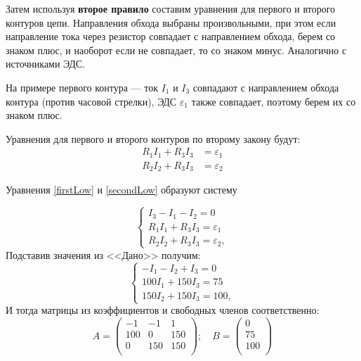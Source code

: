 \documentclass[14pt,a4paper]{article}
\begin{document}
Затем используя \textbf{второе правило} составим уравнения для первого и второго контуров цепи. Направления обхода выбраны произвольными, при этом если направление тока через резистор совпадает с направлением обхода, берем со знаком плюс, и наоборот если не совпадает, то со знаком минус. Аналогично с источниками ЭДС.

На примере первого контура --- ток $I_1$ и $I_3$ совпадают с направлением обхода контура (против часовой стрелки), ЭДС $\varepsilon_1$ также совпадает, поэтому берем их со знаком плюс.

Уравнения для первого и второго контуров по второму закону будут:
\begin{equation} \label{secondLow}
    \begin{split}
        R_1I_1 + R_3I_3 & = \varepsilon_1 \\
        R_2I_2 +R_3I_3 & = \varepsilon_2
    \end{split}
\end{equation}

Уравнения \ref{firstLow} и \ref{secondLow} образуют систему

\begin{equation}
    \begin{cases}
        I_3 -I_1 - I_2 = 0\\
        R_1I_1 + R_3I_3 = \varepsilon_1 \\
        R_2I_2 +R_3I_3 = \varepsilon_2,
    \end{cases}
\end{equation}
Подставив значения из <<Дано>> получим:
\begin{equation}
    \begin{cases}
        -I_1 -I_2 + I_3 = 0\\
        100I_1 + 150I_3 = 75 \\
        150I_2 + 150I_3 = 100,
    \end{cases}
\end{equation}
И тогда матрицы из коэффициентов и свободных членов соответственно:
\begin{equation}
    A = \begin{pmatrix}
        -1 & -1   & 1   \\
        100 & 0   & 150  \\
        0 & 150   & 150  \\
    \end{pmatrix}; \quad B =
    \begin{pmatrix}
        0  \\
        75  \\
        100 \\
    \end{pmatrix}
\end{equation}
\progress{}
\end{document}
